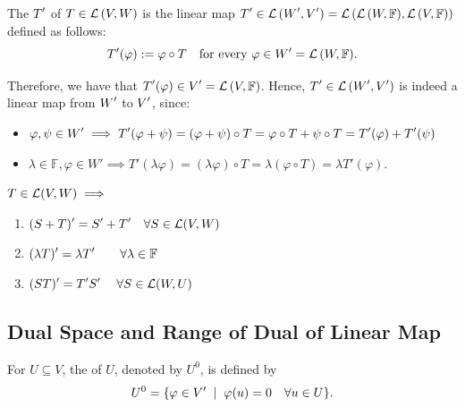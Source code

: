 \setcounter{thm}{117}
\begin{mydef}
  The  $\displaystyle T'$ of $T \in {\mathcal{L}\left (V, W\right )}$ is the linear map $\displaystyle T' \in {\mathcal{L}\left (W', V'\right )} = {\mathcal{L}\left ({\mathcal{L}\left (W, \mathbb{F}\right )}, {\mathcal{L}\left (V, \mathbb{F}\right )}\right )}$ defined as follows:
\begin{equation}
    \displaystyle T'(\varphi) := \varphi \circ T \quad \text{for every } \varphi \in \displaystyle W'={\mathcal{L}\left (W, \mathbb{F}\right )}.
\end{equation}

    Therefore, we have that $\displaystyle T'(\varphi) \in \displaystyle V' = {\mathcal{L}\left (V, \mathbb{F}\right )}$. Hence, $\displaystyle T' \in {\mathcal{L}\left (\displaystyle W', \displaystyle V'\right )}$ is indeed a linear map from $\displaystyle W'$ to $\displaystyle V'$, since:
\begin{itemize}
      \item $\varphi, \psi \in \displaystyle W' \implies T' (\varphi + \psi) = (\varphi + \psi) \circ T = \varphi \circ T + \psi \circ T = T' (\varphi) + T'(\psi)$
    \item $\lambda \in \mathbb{F}, \varphi \in W' \implies T' (\lambda \varphi) = (\lambda \varphi) \circ T = \lambda (\varphi \circ T) = \lambda T' (\varphi)$.
\end{itemize}


\end{mydef}

\setcounter{thm}{119}
\begin{thm} 
  \label{algebraic-properties-of-dual-maps}
  $T \in \mathcal{L}(V,W) \implies$
  \begin{enumerate}[label=\textbf{(\alph*)}]
    \item $\displaystyle (S+T)' = \displaystyle S' + \displaystyle T' \quad \forall S \in \mathcal{L}(V,W)$
    \item $\displaystyle (\lambda T)' = \lambda \displaystyle T' \quad \quad \forall \lambda \in \mathbb{F}$
    \item $\displaystyle (ST)' = \displaystyle T'\displaystyle S' \quad \; \forall S \in \mathcal{L} (W,U)$
  \end{enumerate}
\end{thm}



\subsection{Dual Space and Range of Dual of Linear Map}

\begin{mydef} [annihilator, $U^0$]
  \label{def: annihilator}
  For $U \subseteq V$, the  of $U$, denoted by $U^{0}$, is defined by
  \begin{equation}
    U^0 = \{ \varphi \in \displaystyle V' \; \mid \; \varphi (u) = 0 \quad \forall u \in U \}.
  \end{equation}
\end{mydef}

